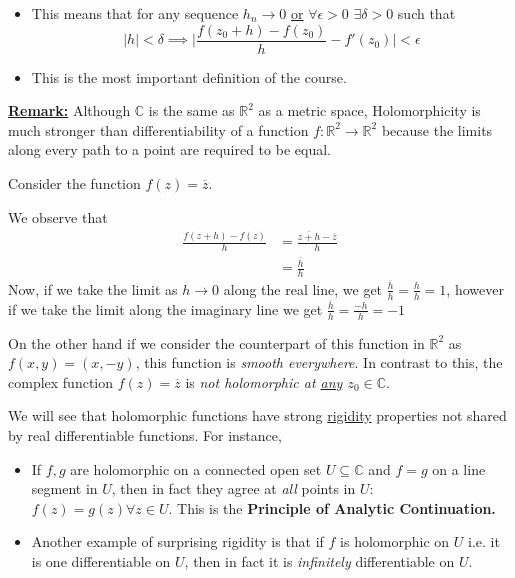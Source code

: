 \documentclass{article}
\newcommand{\R}{\mathbb{R}}
\newcommand{\C}{\mathbb{C}}
\begin{document}
\vskip 0.5cm
\begin{itemize}
  \item   This means that for any sequence $h_n \rightarrow 0$ \underline{or} $\forall \epsilon > 0$ $\exists \delta > 0$ such that 
  \[ |h| < \delta \implies \lvert \frac{f(z_0 + h)-f(z_0)}{h} - f'(z_0) \rvert < \epsilon\]

  \item This is the most important definition of the course.
\end{itemize}

\underline{\textbf{Remark:}} Although $\C$ is the same as $\R^2$ as a metric space, Holomorphicity is much stronger than differentiability of a function $f : \R^2 \rightarrow \R^2$ because the limits along every path to a point are required to be equal.

\vskip 0.5cm
 Consider the function $f(z) = \overline{z}$.

\vskip 0.5cm
We observe that 
\begin{align*}
  \frac{f(z+h)-f(z)}{h} &= \frac{\overline{z+h}-\overline{z}}{h} \\
  &= \frac{\overline{h}}{h}
\end{align*}
Now, if we take the limit as $h \rightarrow 0$ along the real line, we get $\frac{\overline{h}}{h} = \frac{h}{h} = 1$, however if we take the limit along 
the imaginary line we get $\frac{\overline{h}}{h} = \frac{-h}{h} = -1$

\vskip 0.5cm
On the other hand if we consider the counterpart of this function in $\R^2$ as 
$f(x, y) = (x, -y)$, this function is \emph{smooth everywhere}. In contrast to this, the complex function $f(z) = \overline{z}$ is \emph{not holomorphic at \underline{any} $z_0 \in \C$}.

\vskip 0.5cm
We will see that holomorphic functions have strong \underline{rigidity} properties not shared by real differentiable functions. For instance,
\begin{itemize}
  \item If $f, g$ are holomorphic on a connected open set $U \subseteq \C$ and $f = g$ on a line segment in $U$, then in fact they agree at \emph{all} points in $U$: $f(z) = g(z) \forall z \in U$. This is the \textbf{Principle of Analytic Continuation.}
  \item Another example of surprising rigidity is that if $f$ is holomorphic on $U$ i.e. it is one differentiable on $U$, then in fact it is \emph{infinitely} differentiable on $U$.
\end{itemize}
\end{document}

